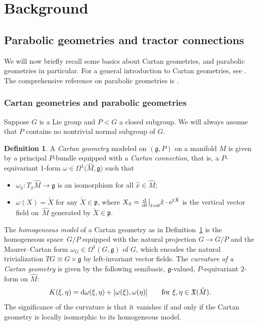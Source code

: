 \documentclass[10pt,a4paper]{amsart}
\numberwithin{equation}{section}
\theoremstyle{definition}
\newtheorem{defin}[thm]{Definition}
\def\g{{\mathfrak g}}
\def\p{{\mathfrak p}}
\begin{document}
\section{Background}

\subsection{Parabolic geometries and tractor connections}

\label{sec.parabolic.tractor}
We will now briefly recall some basics about Cartan geometries, and parabolic geometries in particular.
For a general introduction to Cartan geometries, see \cite{sharpe}.
The comprehensive reference on
parabolic geometries is \cite{cap.slovak.book.vol1}.

\subsubsection{Cartan geometries and parabolic geometries}
Suppose $G$ is a Lie group and $P<G$ a closed subgroup. We will always assume that $P$ contains no nontrivial normal subgroup of $G$.
\begin{defin}
 \label{defin.cartan.geom}
 A \emph{Cartan geometry} modeled on $(\g, P)$ on a manifold $M$ is given by a principal $P$-bundle  equipped with a
 \emph{Cartan connection}, that is, a $P$-equivariant $1$-form ${\omega\in\Omega^1\bigl(\hat{M},\g\bigr)}$ such that
 \begin{itemize}\itemsep=0pt
 \item $\omega_{\hat{x}}\colon T_{\hat{x}} \hat{M}\rightarrow \g$ is an isomorphism for all $\hat{x}\in \hat{M}$;
 \item $\omega(X)= \check{X}$ for any $\check{X}\in \p$,
 where $X_{\hat{x}}= \frac{{\rm d}}{{\rm d}t}\big|_{t=0 } \hat{x}\cdot {\rm e}^{t \check{X}}$ is the vertical vector field on~$\hat{M}$ generated by $\check{X}\in\p$.
 \end{itemize}
 \end{defin}
 The \emph{homogeneous model} of a Cartan geometry as in Definition~\ref{defin.cartan.geom} is the homogeneous space~$G/P$ equipped with the natural projection $G\rightarrow G/P$ and
 the Maurer--Cartan form ${\omega_G\in\Omega^1(G,\g)}$ of $G$, which encodes the natural trivialization $TG\cong G\times\g$ by left-invariant vector fields.
 The \emph{curvature of a Cartan geometry} is given by the following semibasic, $\g$-valued, $P$-equivariant $2$-form on $\hat{M}$:
 \begin{equation*}
 K(\xi,\eta)={\rm d}\omega(\xi,\eta)+[\omega(\xi), \omega(\eta)] \qquad\textrm{for } \xi,\eta\in\mathfrak X(\hat{M}).
 \end{equation*}
 The significance of the curvature is that it vanishes if and only if the Cartan geometry is locally isomorphic to its homogeneous model.
\end{document}
